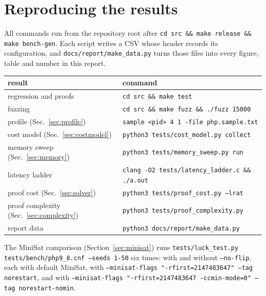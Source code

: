 \section{Reproducing the results}
\label{app:repro}

All commands run from the repository root after \texttt{cd src \&\& make
release \&\& make bench-gen}. Each script writes a CSV whose header records its
configuration, and \texttt{docs/report/make\_data.py} turns those files into
every figure, table and number in this report.

\begin{center}\small
\begin{tabular}{ll}
\toprule
result & command \\
\midrule
regression and proofs & \texttt{cd src \&\& make test} \\
fuzzing & \texttt{cd src \&\& make fuzz \&\& ./fuzz 15000} \\
profile (Sec.~\ref{sec:profile}) & \texttt{sample <pid> 4 1 -file php.sample.txt} \\
cost model (Sec.~\ref{sec:costmodel}) & \texttt{python3 tests/cost\_model.py collect} \\
memory sweep (Sec.~\ref{sec:memory}) & \texttt{python3 tests/memory\_sweep.py run} \\
latency ladder & \texttt{clang -O2 tests/latency\_ladder.c \&\& ./a.out} \\
proof cost (Sec.~\ref{sec:solver}) & \texttt{python3 tests/proof\_cost.py --lrat} \\
proof complexity (Sec.~\ref{sec:complexity}) & \texttt{python3 tests/proof\_complexity.py} \\
report data & \texttt{python3 docs/report/make\_data.py} \\
\bottomrule
\end{tabular}
\end{center}

The MiniSat comparison (Section~\ref{sec:minisat}) runs
\texttt{tests/luck\_test.py tests/bench/php9\_8.cnf --seeds 1-50} six times:
with and without \texttt{--no-flip}, each with default MiniSat, with
\texttt{--minisat-flags "-rfirst=2147483647" --tag norestart}, and with
\texttt{--minisat-flags "-rfirst=2147483647 -ccmin-mode=0" --tag
norestart-nomin}.
